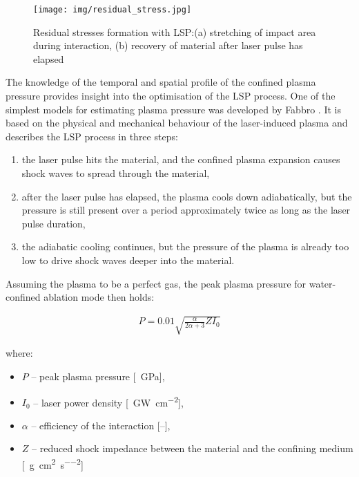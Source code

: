 \begin{figure}[h]
    \centering
    \texttt{[image: img/residual\_stress.jpg]}
    \caption[Residual stresses formation with LSP]{Residual stresses formation with LSP:(a) stretching of impact area during interaction, (b) recovery of material after laser pulse has elapsed \protect\cite{fabbro_peyre_berthe_scherpereel_1998}}
    \label{fig:lspresidual}
\end{figure}


The knowledge of the temporal and spatial profile of the confined plasma pressure provides insight into the optimisation of the LSP process. One of the simplest models for estimating plasma pressure was developed by Fabbro \cite{fabbro_peyre_berthe_scherpereel_1998}. It is based on the physical and mechanical behaviour of the laser-induced plasma and describes the LSP process in three steps:

\begin{enumerate}
    \item the laser pulse hits the material, and the confined plasma expansion causes shock waves to spread through the material,
    \item after the laser pulse has elapsed, the plasma cools down adiabatically, but the pressure is still present over a period approximately twice as long as the laser pulse duration,
    \item the adiabatic cooling continues, but the pressure of the plasma is already too low to drive shock waves deeper into the material.
\end{enumerate}

Assuming the plasma to be a perfect gas, the peak plasma pressure for water-confined ablation mode then holds:

\begin{gather} \label{pressure}
P = 0.01\sqrt{\frac{\alpha}{2\alpha + 3} Z I_{0} }   
\end{gather} 

where:

\begin{itemize}

    \item $P$ -- peak plasma pressure [\SI{}{\giga\pascal}],

    \item $I_{0}$ -- laser power density [\SI{}{\giga\watt\per\cm\squared}],
    
    \item $\alpha$ -- efficiency of the interaction [--],
    
    \item $Z$ -- reduced shock impedance between the material and the confining medium [\SI{}{\gram\per\cm\squared\per\second\squared}]
\end{itemize}
    
